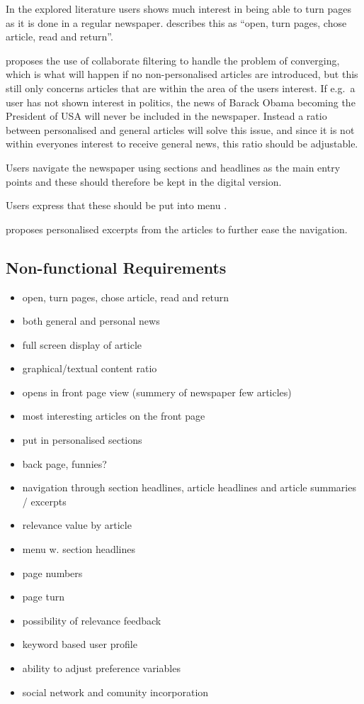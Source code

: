 In the explored literature users shows much interest in being able to turn pages as it is done in a regular newspaper. \cite[p. 6]{FULLTEXT01.pdf} describes this as ``open, turn pages, chose article, read and return''.

\cite{fulltext.pdf} proposes the use of collaborate filtering to handle the problem of converging, which is what will happen if no non-personalised articles are introduced, but this still only concerns articles that are within the area of the users interest. If e.g.\ a user has not shown interest in politics, the news of Barack Obama becoming the President of USA will never be included in the newspaper. Instead a ratio between personalised and general articles will solve this issue, and since it is not within everyones interest to receive general news, this ratio should be adjustable.

Users navigate the newspaper using sections and headlines as the main entry points \cite{FULLTEXT01.pdf} and these should therefore be kept in the digital version.

Users express that these should be put into menu \cite{kristin_fredrik.pdf}.

\cite{fulltext.pdf} proposes personalised excerpts from the articles to further ease the navigation.

\subsection{Non-functional Requirements}
\begin{itemize}
	\item open, turn pages, chose article, read and return
	\item both general and personal news
	\item full screen display of article
	\item graphical/textual content ratio
	\item opens in front page view (summery of newspaper few articles)
	\item most interesting articles on the front page
	\item put in personalised sections
	\item back page, funnies?
	\item navigation through section headlines, article headlines and article summaries / excerpts
	\item relevance value by article
	\item menu w. section headlines
	\item page numbers
	\item page turn
	\item possibility of relevance feedback
	\item keyword based user profile
	\item ability to adjust preference variables
	\item social network and comunity incorporation
\end{itemize}

